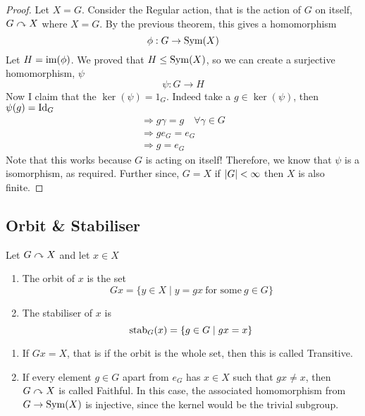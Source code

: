 \documentclass{article}
\begin{document}
\begin{proof}
    Let $X = G$. Consider the Regular action, that is the action of $G$ on itself, $G \curvearrowright X$ where $X = G$. By the previous theorem, this gives a homomorphism
    \[
        \phi: G \rightarrow \operatorname{Sym}(X)  
    \]
    Let $H = \operatorname{im}(\phi)$. We proved that $H \leq \operatorname{Sym}(X)$, so we can create a surjective homomorphism, $\psi$
    \[
        \psi: G \rightarrow H  
    \]
    Now I claim that the $\ker(\psi) = 1_G$. Indeed take a $g \in \ker(\psi)$, then $\psi(g) = \mathrm{Id}_G$
    \begin{align*}
        \Rightarrow g \gamma = g \quad \forall \gamma \in G \\
        \Rightarrow g e_G = e_G \\
        \Rightarrow g = e_G
    \end{align*}
    Note that this works because $G$ is acting on itself! Therefore, we know that $\psi$ is a isomorphism, as required. Further since, $G = X$ if $\left\lvert G\right\rvert < \infty$ then $X$ is also finite.
\end{proof}

\subsection{Orbit \& Stabiliser}

\begin{defi}
    Let $G \curvearrowright X$ and let $x \in X$
    \begin{enumerate}
        \item The orbit of $x$ is the set
        \[
            Gx = \{y \in X \mid y = gx \ \text{for some} \ g \in G\}  
        \]
        \item The stabiliser of $x$ is
        \[
            \operatorname{stab}_G(x) = \{g \in G \mid gx = x\}
        \]
    \end{enumerate}    
\end{defi}

\begin{remark}\leavevmode
    \begin{enumerate}
        \item If $Gx = X$, that is if the orbit is the whole set, then this is called Transitive.
        \item If every element $g \in G$ apart from $e_G$ has $x \in X$ such that $gx \neq x$, then $G \curvearrowright X$ is called Faithful. 
        In this case, the associated homomorphism from $G \rightarrow \operatorname{Sym}(X)$ is injective, since the kernel would be the trivial subgroup.
    \end{enumerate}
\end{remark}
\end{document}
